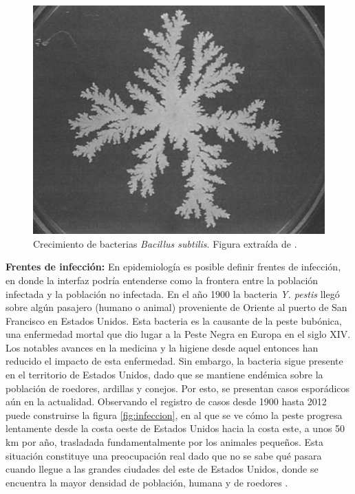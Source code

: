 \begin{figure}[ht]
    \centering
    \includegraphics[width=\imsize]{Bacteria.png}
    \caption[Crecimiento de bacterias \textit{Bacillus subtilis}.]{Crecimiento de bacterias \textit{Bacillus subtilis}. Figura extraída de \cite{matsushita1990diffusion}.}
    \label{fig:bacteria}
\end{figure}

\textbf{Frentes de infección:} En epidemiología es posible definir frentes de infección, en donde la interfaz podría entenderse como la frontera 
entre la población infectada y la población no infectada. En el año 1900 la bacteria \textit{Y. pestis} llegó sobre algún pasajero (humano o animal) proveniente de Oriente
al puerto de San Francisco en Estados Unidos. Esta bacteria es la causante de la peste bubónica, una enfermedad mortal que dio lugar a la Peste Negra en Europa 
en el siglo XIV. Los notables avances en la medicina y la higiene desde aquel entonces han reducido el impacto de esta enfermedad. Sin embargo, la bacteria 
sigue presente en el territorio de Estados Unidos, dado que se mantiene endémica sobre la población de roedores, ardillas y conejos. Por esto, se presentan casos 
esporádicos aún en la actualidad. Observando el registro de casos desde 1900 hasta 2012 puede construirse la figura \ref{fig:infeccion}, en al que se ve cómo la peste 
progresa lentamente desde la costa oeste de Estados Unidos hacia la costa este, a unos 50 km por año, trasladada fundamentalmente por los animales pequeños. Esta 
situación constituye una preocupación real dado que no se sabe qué pasara cuando llegue a las grandes ciudades del este de Estados Unidos, donde se encuentra 
la mayor densidad de población, humana y de roedores \cite{mate_sist_bio,barbieri2020soil,stenseth2008plague,kolton}.
\newpage

